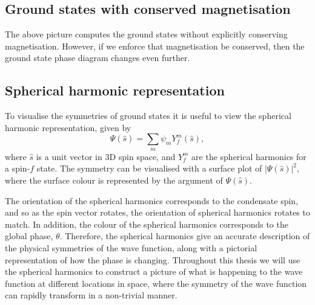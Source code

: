 \subsection{Ground states with conserved magnetisation}
The above picture computes the ground states without explicitly conserving
magnetisation.
However, if we enforce that magnetisation be conserved, then the ground state
phase diagram changes even further.


\subsection{Spherical harmonic representation}
To visualise the symmetries of ground states it is useful to view the spherical
harmonic representation, given by
\begin{equation}
    \Psi(\hat{s}) = \sum_m\psi_m Y_f^m(\hat{s}),
\end{equation}
where \(\hat{s}\) is a unit vector in 3D spin space, and \(Y_f^m \) are the
spherical harmonics for a spin-\(f\) state.
The symmetry can be visualised with a surface plot of \(|\Psi(\hat{s})|^2\),
where the surface colour is represented by the argument of \(\Psi(\hat{s})\).

The orientation of the spherical harmonics corresponds to the condensate spin,
and so as the spin vector rotates, the orientation of spherical harmonics
rotates to match.
In addition, the colour of the spherical harmonics corresponds to the global
phase, \( \theta \).
Therefore, the spherical harmonics give an accurate description of the
physical symmetries of the wave function, along with a pictorial representation
of how the phase is changing.
Throughout this thesis we will use the spherical harmonics to construct a
picture of what is happening to the wave function at different locations in
space, where the symmetry of the wave function can rapidly transform in a
non-trivial manner.

